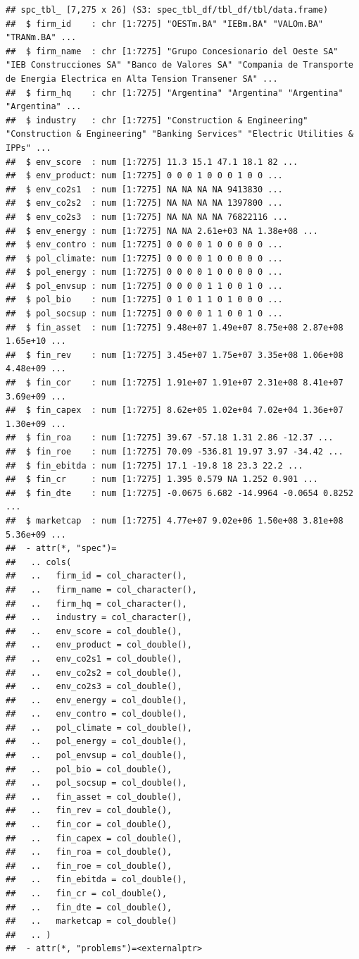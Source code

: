 \documentclass[
]{article}
\begin{document}
\begin{verbatim}
## spc_tbl_ [7,275 x 26] (S3: spec_tbl_df/tbl_df/tbl/data.frame)
##  $ firm_id    : chr [1:7275] "OESTm.BA" "IEBm.BA" "VALOm.BA" "TRANm.BA" ...
##  $ firm_name  : chr [1:7275] "Grupo Concesionario del Oeste SA" "IEB Construcciones SA" "Banco de Valores SA" "Compania de Transporte de Energia Electrica en Alta Tension Transener SA" ...
##  $ firm_hq    : chr [1:7275] "Argentina" "Argentina" "Argentina" "Argentina" ...
##  $ industry   : chr [1:7275] "Construction & Engineering" "Construction & Engineering" "Banking Services" "Electric Utilities & IPPs" ...
##  $ env_score  : num [1:7275] 11.3 15.1 47.1 18.1 82 ...
##  $ env_product: num [1:7275] 0 0 0 1 0 0 0 1 0 0 ...
##  $ env_co2s1  : num [1:7275] NA NA NA NA 9413830 ...
##  $ env_co2s2  : num [1:7275] NA NA NA NA 1397800 ...
##  $ env_co2s3  : num [1:7275] NA NA NA NA 76822116 ...
##  $ env_energy : num [1:7275] NA NA 2.61e+03 NA 1.38e+08 ...
##  $ env_contro : num [1:7275] 0 0 0 0 1 0 0 0 0 0 ...
##  $ pol_climate: num [1:7275] 0 0 0 0 1 0 0 0 0 0 ...
##  $ pol_energy : num [1:7275] 0 0 0 0 1 0 0 0 0 0 ...
##  $ pol_envsup : num [1:7275] 0 0 0 0 1 1 0 0 1 0 ...
##  $ pol_bio    : num [1:7275] 0 1 0 1 1 0 1 0 0 0 ...
##  $ pol_socsup : num [1:7275] 0 0 0 0 1 1 0 0 1 0 ...
##  $ fin_asset  : num [1:7275] 9.48e+07 1.49e+07 8.75e+08 2.87e+08 1.65e+10 ...
##  $ fin_rev    : num [1:7275] 3.45e+07 1.75e+07 3.35e+08 1.06e+08 4.48e+09 ...
##  $ fin_cor    : num [1:7275] 1.91e+07 1.91e+07 2.31e+08 8.41e+07 3.69e+09 ...
##  $ fin_capex  : num [1:7275] 8.62e+05 1.02e+04 7.02e+04 1.36e+07 1.30e+09 ...
##  $ fin_roa    : num [1:7275] 39.67 -57.18 1.31 2.86 -12.37 ...
##  $ fin_roe    : num [1:7275] 70.09 -536.81 19.97 3.97 -34.42 ...
##  $ fin_ebitda : num [1:7275] 17.1 -19.8 18 23.3 22.2 ...
##  $ fin_cr     : num [1:7275] 1.395 0.579 NA 1.252 0.901 ...
##  $ fin_dte    : num [1:7275] -0.0675 6.682 -14.9964 -0.0654 0.8252 ...
##  $ marketcap  : num [1:7275] 4.77e+07 9.02e+06 1.50e+08 3.81e+08 5.36e+09 ...
##  - attr(*, "spec")=
##   .. cols(
##   ..   firm_id = col_character(),
##   ..   firm_name = col_character(),
##   ..   firm_hq = col_character(),
##   ..   industry = col_character(),
##   ..   env_score = col_double(),
##   ..   env_product = col_double(),
##   ..   env_co2s1 = col_double(),
##   ..   env_co2s2 = col_double(),
##   ..   env_co2s3 = col_double(),
##   ..   env_energy = col_double(),
##   ..   env_contro = col_double(),
##   ..   pol_climate = col_double(),
##   ..   pol_energy = col_double(),
##   ..   pol_envsup = col_double(),
##   ..   pol_bio = col_double(),
##   ..   pol_socsup = col_double(),
##   ..   fin_asset = col_double(),
##   ..   fin_rev = col_double(),
##   ..   fin_cor = col_double(),
##   ..   fin_capex = col_double(),
##   ..   fin_roa = col_double(),
##   ..   fin_roe = col_double(),
##   ..   fin_ebitda = col_double(),
##   ..   fin_cr = col_double(),
##   ..   fin_dte = col_double(),
##   ..   marketcap = col_double()
##   .. )
##  - attr(*, "problems")=<externalptr>
\end{verbatim}
\end{document}
